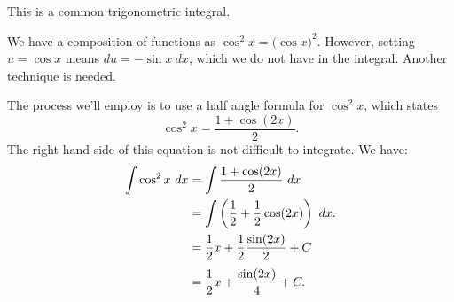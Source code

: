 
This is a common trigonometric integral.\bigskip

{We have a composition of functions as $\cos^2x = \big(\cos x\big)^2$. However, setting $u = \cos x$ means $du = -\sin x\ dx$, which we do not have in the integral. Another technique is needed.

The process we'll employ is to use a half angle formula for $\cos^2x$, which states 
\[\cos ^2x = \frac{1+\cos(2x)}{2}.\]
The right hand side of this equation is not difficult to integrate. We have:
\begin{align*}
	\int \cos^2x\ dx
	&= \int \frac{1+\cos(2x)}2\ dx \\
	&= \int \left( \frac12 + \frac12\cos(2x)\right)\ dx. \\
	&= \frac12x + \frac12\frac{\sin(2x)}{2} + C \rule[-10pt]{0pt}{5pt}\\
	&= \frac12x + \frac{\sin(2x)}4 + C.
\end{align*}%
}


